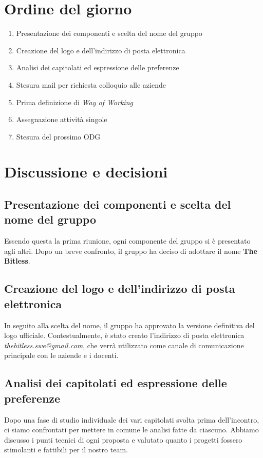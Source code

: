 \documentclass[a4paper, 10pt, colorlinks=true, linkcolor=black, urlcolor=blue, citecolor=blue, hidelinks]{article}
\begin{document}
\section{Ordine del giorno}
\begin{enumerate}
    \item Presentazione dei componenti e scelta del nome del gruppo
    \item Creazione del logo e dell'indirizzo di posta elettronica
    \item Analisi dei capitolati ed espressione delle preferenze
    \item Stesura mail per richiesta colloquio alle aziende
    \item Prima definizione di \textit{Way of Working}
    \item Assegnazione attività singole
    \item Stesura del prossimo ODG
\end{enumerate}

\section{Discussione e decisioni}
\subsection{Presentazione dei componenti e scelta del nome del gruppo}
Essendo questa la prima riunione, ogni componente del gruppo si è presentato agli altri. Dopo un breve confronto, il gruppo ha deciso di adottare il nome \textbf{The Bitless}.

\subsection{Creazione del logo e dell'indirizzo di posta elettronica}
In seguito alla scelta del nome, il gruppo ha approvato la versione definitiva del logo ufficiale. Contestualmente, è stato creato l'indirizzo di posta elettronica \textit{thebitless.swe@gmail.com}, che verrà utilizzato come canale di comunicazione principale con le aziende e i docenti.

\subsection{Analisi dei capitolati ed espressione delle preferenze}
Dopo una fase di studio individuale dei vari capitolati svolta prima dell'incontro, ci siamo confrontati per mettere in comune le analisi fatte da ciascuno. Abbiamo discusso i punti tecnici di ogni proposta e valutato quanto i progetti fossero stimolanti e fattibili per il nostro team.
\end{document}

